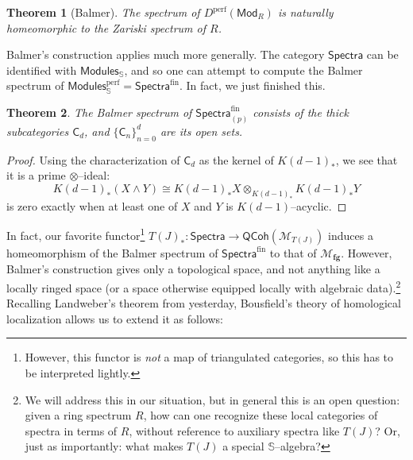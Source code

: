 \documentclass{amsart}
\renewcommand{\S}{\mathbb S}
\newcommand{\M}{\mathcal{M}}
\newcommand{\<}{\langle}
\renewcommand{\>}{\rangle}
\newcommand{\sm}{\wedge}
\newcommand{\CatOf}[1]{\mathsf{#1}}
\newcommand{\moduli}[1]{\mathcal{M}_{\mathbf{#1}}}
\newcommand{\perf}{\mathrm{perf}}
\theoremstyle{plain}
\newtheorem*{theorem}{Theorem}
\theoremstyle{definition}
\theoremstyle{remark}
\begin{document}
\begin{theorem}[Balmer]
The spectrum of $D^{\perf}(\CatOf{Mod}_R)$ is naturally homeomorphic to the Zariski spectrum of $R$.
\end{theorem}

Balmer's construction applies much more generally.  The category $\CatOf{Spectra}$ can be identified with $\CatOf{Modules}_{\S}$, and so one can attempt to compute the Balmer spectrum of $\CatOf{Modules}_{\S}^{\perf} = \CatOf{Spectra}^{\mathrm{fin}}$.  In fact, we just finished this.
\begin{theorem}
The Balmer spectrum of $\CatOf{Spectra}_{(p)}^{\mathrm{fin}}$ consists of the thick subcategories $\CatOf C_d$, and $\{\CatOf C_n\}_{n=0}^d$ are its open sets.
\end{theorem}
\begin{proof}
Using the characterization of $\CatOf C_d$ as the kernel of $K(d-1)_*$, we see that it is a prime $\otimes$--ideal: \[K(d-1)_*(X \sm Y) \cong K(d-1)_* X \otimes_{K(d-1)_*} K(d-1)_* Y\] is zero exactly when at least one of $X$ and $Y$ is $K(d-1)$--acyclic.
\end{proof}

In fact, our favorite functor\footnote{However, this functor is \emph{not} a map of triangulated categories, so this has to be interpreted lightly.} $T(J)_*: \CatOf{Spectra} \to \CatOf{QCoh}(\M_{T(J)})$ induces a homeomorphism of the Balmer spectrum of $\CatOf{Spectra}^{\mathrm{fin}}$ to that of $\moduli{fg}$.  However, Balmer's construction gives only a topological space, and not anything like a locally ringed space (or a space otherwise equipped locally with algebraic data).\footnote{We will address this in our situation, but in general this is an open question: given a ring spectrum $R$, how can one recognize these local categories of spectra in terms of $R$, without reference to auxiliary spectra like $T(J)$?  Or, just as importantly: what makes $T(J)$ a special $\S$--algebra?}  Recalling Landweber's theorem from yesterday, Bousfield's theory of homological localization allows us to extend it as follows:
\end{document}
